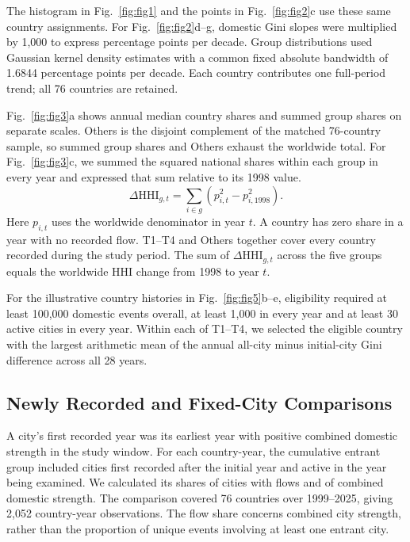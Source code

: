 The histogram in Fig.~\ref{fig:fig1} and the points in Fig.~\ref{fig:fig2}c use these same country assignments. For Fig.~\ref{fig:fig2}d--g, domestic Gini slopes were multiplied by 1,000 to express percentage points per decade. Group distributions used Gaussian kernel density estimates with a common fixed absolute bandwidth of 1.6844 percentage points per decade. Each country contributes one full-period trend; all 76 countries are retained.

Fig.~\ref{fig:fig3}a shows annual median country shares and summed group shares on separate scales. Others is the disjoint complement of the matched 76-country sample, so summed group shares and Others exhaust the worldwide total. For Fig.~\ref{fig:fig3}c, we summed the squared national shares within each group in every year and expressed that sum relative to its 1998 value.
\begin{equation*}
\Delta\mathrm{HHI}_{g,t}=\sum_{i\in g}\left(p_{i,t}^{2}-p_{i,1998}^{2}\right).
\end{equation*}
Here $p_{i,t}$ uses the worldwide denominator in year $t$. A country has zero share in a year with no recorded flow. T1--T4 and Others together cover every country recorded during the study period. The sum of $\Delta\mathrm{HHI}_{g,t}$ across the five groups equals the worldwide HHI change from 1998 to year $t$.

For the illustrative country histories in Fig.~\ref{fig:fig5}b--e, eligibility required at least 100,000 domestic events overall, at least 1,000 in every year and at least 30 active cities in every year. Within each of T1--T4, we selected the eligible country with the largest arithmetic mean of the annual all-city minus initial-city Gini difference across all 28 years.

\subsection{Newly Recorded and Fixed-City Comparisons}

A city's first recorded year was its earliest year with positive combined domestic strength in the study window. For each country-year, the cumulative entrant group included cities first recorded after the initial year and active in the year being examined. We calculated its shares of cities with flows and of combined domestic strength. The comparison covered 76 countries over 1999--2025, giving 2,052 country-year observations. The flow share concerns combined city strength, rather than the proportion of unique events involving at least one entrant city.

